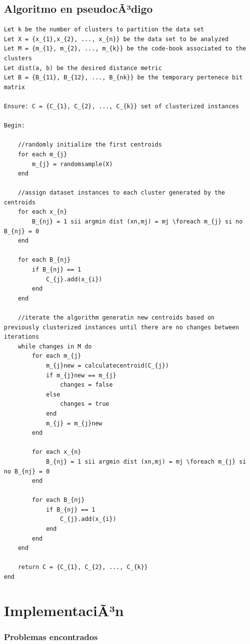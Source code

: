 \documentclass[10pt,a4paper]{article}
\begin{document}

\subsection{Algoritmo en pseudocÃ³digo}

\begin{lstlisting}
Let k be the number of clusters to partition the data set
Let X = {x_{1},x_{2}, ..., x_{n}} be the data set to be analyzed
Let M = {m_{1}, m_{2}, ..., m_{k}} be the code-book associated to the clusters
Let dist(a, b) be the desired distance metric
Let B = {B_{11}, B_{12}, ..., B_{nk}} be the temporary pertenece bit matrix

Ensure: C = {C_{1}, C_{2}, ..., C_{k}} set of clusterized instances

Begin:

	//randomly initialize the first centroids
	for each m_{j}
		m_{j} = randomsample(X)
	end
	
	//assign dataset instances to each cluster generated by the centroids
	for each x_{n}
		B_{nj} = 1 sii argmin dist (xn,mj) = mj \foreach m_{j} si no B_{nj} = 0 
	end
		
	for each B_{nj}
		if B_{nj} == 1
			C_{j}.add(x_{i}) 
		end
	end
	
	//iterate the algorithm generatin new centroids based on previously clusterized instances until there are no changes between iterations
	while changes in M do
		for each m_{j}
			m_{j}new = calculatecentroid(C_{j})
			if m_{j}new == m_{j}
				changes = false
			else
				changes = true
			end
			m_{j} = m_{j}new	
		end
		
		for each x_{n}
			B_{nj} = 1 sii argmin dist (xn,mj) = mj \foreach m_{j} si no B_{nj} = 0 
		end
		
		for each B_{nj}
			if B_{nj} == 1
				C_{j}.add(x_{i}) 
			end
		end
	end
	
	return C = {C_{1}, C_{2}, ..., C_{k}}
end
\end{lstlisting}
\section{ImplementaciÃ³n}

\subsubsection{Problemas encontrados} 
\end{document}
